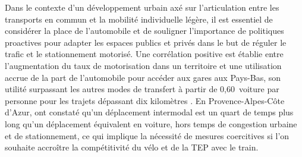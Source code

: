 \begin{refsegment}
Dans le contexte d'un développement urbain axé sur l'articulation entre les transports en commun et la mobilité individuelle légère, il est essentiel de considérer la place de l'automobile et de souligner l'importance de politiques proactives pour adapter les espaces publics et privés dans le but de réguler le trafic et le stationnement motorisé. Une corrélation positive est établie entre l'augmentation du taux de motorisation dans un territoire et une utilisation accrue de la part de l'automobile pour accéder aux gares aux Pays-Bas, son utilité surpassant les autres modes de transfert à partir de 0,60~voiture par personne pour les trajets dépassant dix kilomètres \textcolor{blue}{\autocite[281]{debrezion_modelling_2009}}. En Provence-Alpes-Côte d'Azur, \textcolor{blue}{\textcite[190]{moinse_intermodal_2022}} ont constaté qu'un déplacement intermodal est un quart de temps plus long qu'un déplacement équivalent en voiture, hors temps de congestion urbaine et de stationnement, ce qui implique la nécessité de mesures coercitives si l'on souhaite accroître la compétitivité du vélo et de la \acrshort{TEP} avec le train.%


\end{refsegment}
